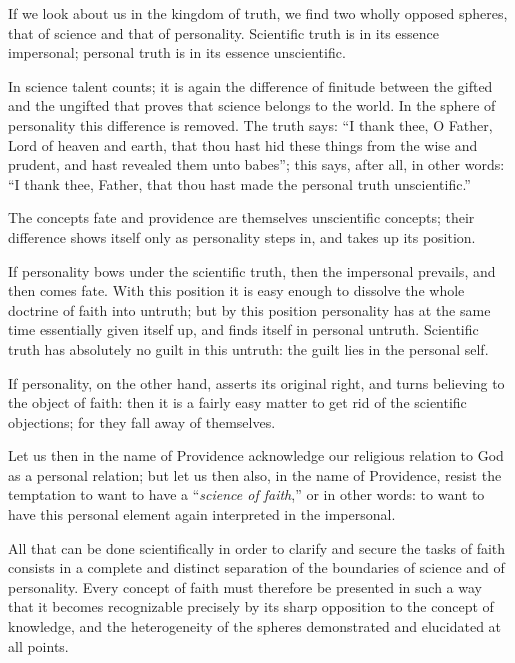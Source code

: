 \documentclass[12pt,a4paper,openany]{book}
\newcommand{\opage}[1]{\marginnote{\footnotesize\textit{[#1]}}}
\begin{document}
If we look about us in the kingdom of truth, we find
two wholly opposed spheres,
that of science and that of personality. Scientific
truth is in its essence impersonal;
personal truth is in its essence unscientific.

In science talent counts; it is again
the difference of finitude between the gifted and
the ungifted that proves that science belongs
to the world. In the sphere of personality this
difference is removed. The truth says: ``I thank
thee, O Father, Lord of heaven and earth,
that thou hast hid these things from the wise and prudent,
and hast revealed them unto babes'';
this says, after all, in other words: ``I thank
\setcounter{footnote}{0}%
\opage{72}thee, Father, that thou hast made the personal
truth unscientific.''

The concepts fate and providence are themselves
unscientific concepts; their difference shows
itself only as personality steps in, and takes up
its position.

If personality bows under the scientific
truth, then the impersonal prevails,
and then comes fate. With this position
it is easy enough to dissolve the whole doctrine of faith
into untruth; but by this position personality
has at the same time essentially given itself up, and
finds itself in personal untruth. Scientific
truth has absolutely no guilt in
this untruth: the guilt lies in the personal
self.

If personality, on the other hand, asserts its original
right, and turns believing to the
object of faith: then it is a fairly easy matter to
get rid of the scientific objections; for
they fall away of themselves.

Let us then in the name of Providence acknowledge
our religious relation to God as a personal
relation; but let us then also, in the name of Providence,
resist the temptation to want
\setcounter{footnote}{0}%
\opage{73}to have a ``\emph{science of faith},'' or in other
words: to want to have this personal element again interpreted
in the impersonal.

All that can be done scientifically in order
to clarify and secure the tasks of faith consists in
a complete and distinct separation of the boundaries of science
and of personality. Every concept of faith must therefore be presented
in such a way that it becomes recognizable precisely by its
sharp opposition to the concept of knowledge, and the
heterogeneity of the spheres demonstrated and elucidated
at all points.
\end{document}
